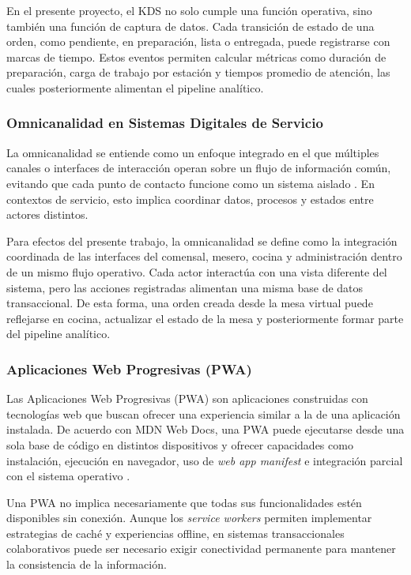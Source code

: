 En el presente proyecto, el KDS no solo cumple una función operativa, sino también una
función de captura de datos. Cada transición de estado de una orden, como pendiente, en
preparación, lista o entregada, puede registrarse con marcas de tiempo. Estos eventos
permiten calcular métricas como duración de preparación, carga de trabajo por estación y
tiempos promedio de atención, las cuales posteriormente alimentan el pipeline analítico.

\subsubsection{Omnicanalidad en Sistemas Digitales de Servicio}

La omnicanalidad se entiende como un enfoque integrado en el que múltiples canales o
interfaces de interacción operan sobre un flujo de información común, evitando que cada
punto de contacto funcione como un sistema aislado \cite{wang_omnichannel_2024}. En
contextos de servicio, esto implica coordinar datos, procesos y estados entre actores
distintos.

Para efectos del presente trabajo, la omnicanalidad se define como la integración
coordinada de las interfaces del comensal, mesero, cocina y administración dentro de un
mismo flujo operativo. Cada actor interactúa con una vista diferente del sistema, pero las
acciones registradas alimentan una misma base de datos transaccional. De esta forma, una
orden creada desde la mesa virtual puede reflejarse en cocina, actualizar el estado de la
mesa y posteriormente formar parte del pipeline analítico.

\subsubsection{Aplicaciones Web Progresivas (PWA)}

Las Aplicaciones Web Progresivas (PWA) son aplicaciones construidas con tecnologías web
que buscan ofrecer una experiencia similar a la de una aplicación instalada. De acuerdo
con MDN Web Docs, una PWA puede ejecutarse desde una sola base de código en distintos
dispositivos y ofrecer capacidades como instalación, ejecución en navegador, uso de
\textit{web app manifest} e integración parcial con el sistema operativo \cite{mdn_pwa, mdn_manifest}.

Una PWA no implica necesariamente que todas sus funcionalidades estén disponibles sin
conexión. Aunque los \textit{service workers} permiten implementar estrategias de caché y
experiencias offline, en sistemas transaccionales colaborativos puede ser necesario exigir
conectividad permanente para mantener la consistencia de la información.

